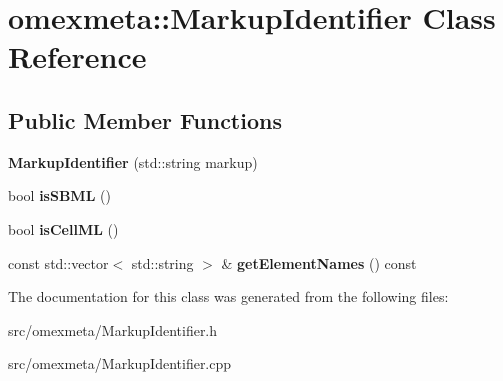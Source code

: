 \hypertarget{classomexmeta_1_1MarkupIdentifier}{}\section{omexmeta\+:\+:Markup\+Identifier Class Reference}
\label{classomexmeta_1_1MarkupIdentifier}
\subsection*{Public Member Functions}
\begin{DoxyCompactItemize}
\item 
\mbox{\label{classomexmeta_1_1MarkupIdentifier_a0bb73ce6d5c94efcd97471059a378058}} 
{\bfseries Markup\+Identifier} (std\+::string markup)
\item 
\mbox{\label{classomexmeta_1_1MarkupIdentifier_a541ffd197ce109e20112923d7fc0641b}} 
bool {\bfseries is\+S\+B\+ML} ()
\item 
\mbox{\label{classomexmeta_1_1MarkupIdentifier_a2fd631a49a8a3d06e668cdbf130d5cb3}} 
bool {\bfseries is\+Cell\+ML} ()
\item 
\mbox{\label{classomexmeta_1_1MarkupIdentifier_ab1736abf0d275bcb6eefcb7f08dcbd4f}} 
const std\+::vector$<$ std\+::string $>$ \& {\bfseries get\+Element\+Names} () const
\end{DoxyCompactItemize}


The documentation for this class was generated from the following files\+:\begin{DoxyCompactItemize}
\item 
src/omexmeta/Markup\+Identifier.\+h\item 
src/omexmeta/Markup\+Identifier.\+cpp\end{DoxyCompactItemize}
